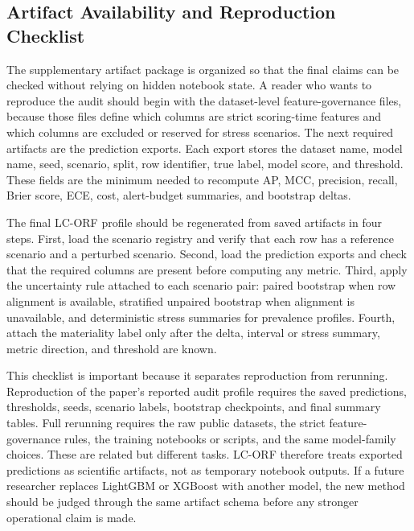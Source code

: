 \documentclass{ieeeaccess}
\begin{document}
\subsection{Artifact Availability and Reproduction Checklist}
The supplementary artifact package is organized so that the final claims can be checked without relying on hidden notebook state. A reader who wants to reproduce the audit should begin with the dataset-level feature-governance files, because those files define which columns are strict scoring-time features and which columns are excluded or reserved for stress scenarios. The next required artifacts are the prediction exports. Each export stores the dataset name, model name, seed, scenario, split, row identifier, true label, model score, and threshold. These fields are the minimum needed to recompute AP, MCC, precision, recall, Brier score, ECE, cost, alert-budget summaries, and bootstrap deltas.

The final LC-ORF profile should be regenerated from saved artifacts in four steps. First, load the scenario registry and verify that each row has a reference scenario and a perturbed scenario. Second, load the prediction exports and check that the required columns are present before computing any metric. Third, apply the uncertainty rule attached to each scenario pair: paired bootstrap when row alignment is available, stratified unpaired bootstrap when alignment is unavailable, and deterministic stress summaries for prevalence profiles. Fourth, attach the materiality label only after the delta, interval or stress summary, metric direction, and threshold are known.

This checklist is important because it separates reproduction from rerunning. Reproduction of the paper's reported audit profile requires the saved predictions, thresholds, seeds, scenario labels, bootstrap checkpoints, and final summary tables. Full rerunning requires the raw public datasets, the strict feature-governance rules, the training notebooks or scripts, and the same model-family choices. These are related but different tasks. LC-ORF therefore treats exported predictions as scientific artifacts, not as temporary notebook outputs. If a future researcher replaces LightGBM or XGBoost with another model, the new method should be judged through the same artifact schema before any stronger operational claim is made.
\end{document}
